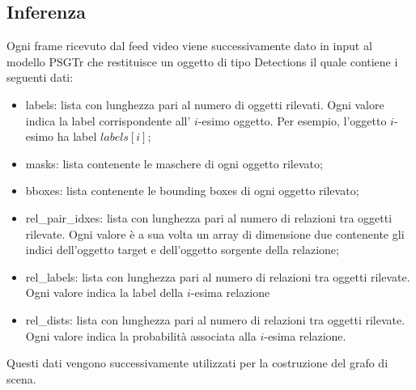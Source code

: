 \subsection{Inferenza}
Ogni frame ricevuto dal feed video viene successivamente dato in input al modello PSGTr \cite{yang2022psg} che restituisce un oggetto di tipo Detections il quale contiene i seguenti dati:
\begin{itemize}
  \item labels: lista con lunghezza pari al numero di oggetti rilevati. Ogni valore indica la label corrispondente all' $i$-esimo oggetto. Per esempio, l'oggetto $i$-esimo ha label $labels[i]$;
  \item masks: lista contenente le maschere di ogni oggetto rilevato;
  \item bboxes: lista contenente le bounding boxes di ogni oggetto rilevato;
  \item rel\_pair\_idxes: lista con lunghezza pari al numero di relazioni tra oggetti rilevate. Ogni valore è a sua volta un array di dimensione due contenente gli indici dell'oggetto target e dell'oggetto sorgente della relazione;
  \item rel\_labels: lista con lunghezza pari al numero di relazioni tra oggetti rilevate. Ogni valore indica la label della $i$-esima relazione
  \item rel\_dists: lista con lunghezza pari al numero di relazioni tra oggetti rilevate. Ogni valore indica la probabilità associata alla $i$-esima relazione.
\end{itemize}
Questi dati vengono successivamente utilizzati per la costruzione del grafo di scena.
